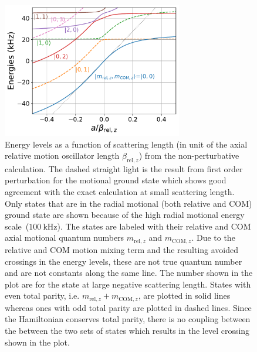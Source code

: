 \begin{figure}
  \centering
  \includegraphics[width=0.7\textwidth]{figures/interaction_shift_energies.pdf}
  \caption[Result of interaction shift calculation.]{
    Energy levels as a function of scattering length
    (in unit of the axial relative motion oscillator length
    $\beta_{\mathrm{rel},z}$) from the non-perturbative calculation.
    The dashed straight light is the result from first order perturbation
    for the motional ground state which shows good agreement with the exact calculation
    at small scattering length.
    Only states that are in the radial motional (both relative and COM) ground state
    are shown because of the high radial motional energy scale~($100~\mathrm{kHz}$).
    The states are labeled with their relative and COM axial motional quantum numbers
    $m_{\mathrm{rel},z}$ and $m_{\mathrm{COM},z}$.
    Due to the relative and COM motion mixing term and the resulting avoided crossings
    in the energy levels, these are not true quantum number
    and are not constants along the same line.
    The number shown in the plot are for the state at large negative scattering length.
    States with even total parity, i.e. $m_{\mathrm{rel},z} + m_{\mathrm{COM},z}$, are plotted in solid lines
    whereas ones with odd total parity are plotted in dashed lines.
    Since the Hamiltonian conserves total parity,
    there is no coupling between the between the two sets of states
    which results in the level crossing shown in the plot.
    \label{fig:interaction-shift:energies}}
\end{figure}

